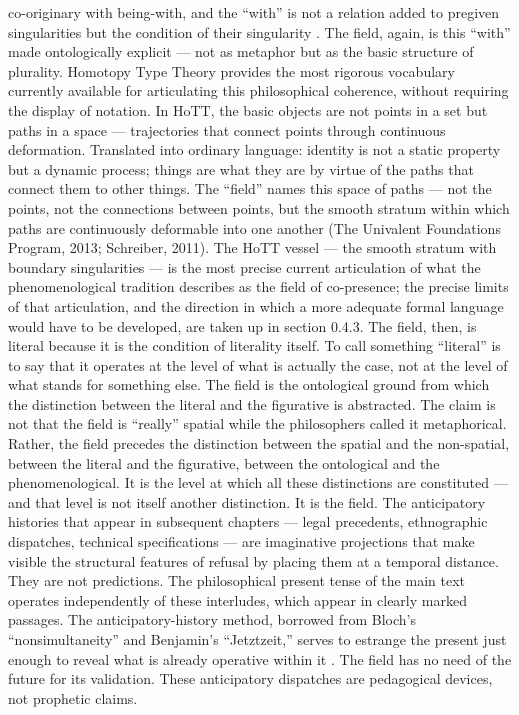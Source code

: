 co-originary with being-with, and the “with” is not a relation added to pregiven singularities but the condition of their singularity \cite{nancy_1996}. The field, again, is this “with” made ontologically explicit — not as metaphor but as the basic structure of plurality. Homotopy Type Theory provides the most rigorous vocabulary currently available for articulating this philosophical coherence, without requiring the display of notation. In HoTT, the basic objects are not points in a set but paths in a space --- trajectories that connect points through continuous deformation. Translated into ordinary language: identity is not a static property but a dynamic process; things are what they are by virtue of the paths that connect them to other things. The ``field'' names this space of paths --- not the points, not the connections between points, but the smooth stratum within which paths are continuously deformable into one another (The Univalent Foundations Program, 2013; Schreiber, 2011). The HoTT vessel --- the smooth stratum with boundary singularities --- is the most precise current articulation of what the phenomenological tradition describes as the field of co-presence; the precise limits of that articulation, and the direction in which a more adequate formal language would have to be developed, are taken up in section 0.4.3. The field, then, is literal because it is the condition of literality itself. To call something “literal” is to say that it operates at the level of what is actually the case, not at the level of what stands for something else. The field is the ontological ground from which the distinction between the literal and the figurative is abstracted. The claim is not that the field is “really” spatial while the philosophers called it metaphorical. Rather, the field precedes the distinction between the spatial and the non-spatial, between the literal and the figurative, between the ontological and the phenomenological. It is the level at which all these distinctions are constituted — and that level is not itself another distinction. It is the field. The anticipatory histories that appear in subsequent chapters --- legal precedents, ethnographic dispatches, technical specifications --- are imaginative projections that make visible the structural features of refusal by placing them at a temporal distance. They are not predictions. The philosophical present tense of the main text operates independently of these interludes, which appear in clearly marked passages. The anticipatory-history method, borrowed from Bloch’s “nonsimultaneity” and Benjamin’s “Jetztzeit,” serves to estrange the present just enough to reveal what is already operative within it \cite{benjamin_1940}. The field has no need of the future for its validation. These anticipatory dispatches are pedagogical devices, not prophetic claims.

